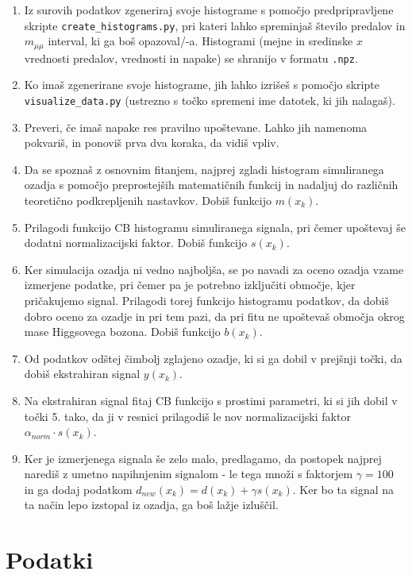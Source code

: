 \documentclass[slovene,11pt,a4paper]{article}
\begin{document}
\begin{enumerate}
    \item Iz surovih podatkov zgeneriraj svoje histograme s pomočjo predpripravljene skripte \texttt{create\_histograms.py}, pri kateri lahko spreminjaš število predalov in $m_{\mu \mu}$ interval, ki ga boš opazoval/-a. Histogrami (mejne in sredinske $x$ vrednosti predalov, vrednosti in napake) se shranijo v formatu \texttt{.npz}.
    \item Ko imaš zgenerirane svoje histograme, jih lahko izrišeš s pomočjo skripte \texttt{visualize\_data.py} (ustrezno s točko spremeni ime datotek, ki jih nalagaš).
    \item Preveri, če imaš napake res pravilno upoštevane. Lahko jih namenoma pokvariš, in ponoviš prva dva koraka, da vidiš vpliv.
    \item Da se spoznaš z osnovnim fitanjem, najprej zgladi histogram simuliranega ozadja s pomočjo preprostejših matematičnih funkcij in nadaljuj do različnih teoretično podkrepljenih nastavkov. Dobiš funkcijo $m(x_k)$.
    \item Prilagodi funkcijo CB histogramu simuliranega signala, pri čemer upoštevaj še dodatni normalizacijski faktor. Dobiš funkcijo $s(x_k)$.
    \item Ker simulacija ozadja ni vedno najboljša, se po navadi za oceno ozadja vzame izmerjene podatke, pri čemer pa je potrebno izključiti območje, kjer pričakujemo signal. Prilagodi torej funkcijo histogramu podatkov, da dobiš dobro oceno za ozadje in pri tem pazi, da pri fitu ne upoštevaš območja okrog mase Higgsovega bozona. Dobiš funkcijo $b(x_k)$.
    \item Od podatkov odštej čimbolj zglajeno ozadje, ki si ga dobil v prejšnji točki, da dobiš ekstrahiran signal $y(x_k)$.
    \item Na ekstrahiran signal fitaj CB funkcijo s prostimi parametri, ki si jih dobil v točki 5. tako, da ji v resnici prilagodiš le nov normalizacijski faktor $\alpha_{norm} \cdot s(x_k)$.
    \item Ker je izmerjenega signala še zelo malo, predlagamo, da postopek najprej narediš z umetno napihnjenim signalom - le tega množi s faktorjem $\gamma = 100$ in ga dodaj podatkom $d_{new}(x_k) = d(x_k) + \gamma s(x_k)$. Ker bo ta signal na ta način lepo izstopal iz ozadja, ga boš lažje izluščil.
\end{enumerate}

\section{Podatki}
\end{document}
